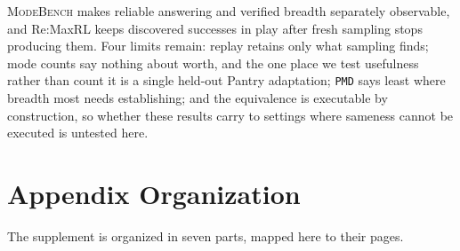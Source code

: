 \documentclass{article}
\newcommand{\1}{\mathbf 1}
\newcommand{\mb}{\textsc{ModeBench}}
\newcommand{\pmd}{\texttt{PMD}}
\theoremstyle{remark}
\theoremstyle{definition}
\theoremstyle{plain}
\begin{document}
\mb{} makes reliable answering and verified breadth separately observable, and
Re:MaxRL keeps discovered successes in play after fresh sampling stops
producing them. Four limits remain: replay retains only what sampling finds;
mode counts say nothing about worth, and the one place we test usefulness
rather than count it is a single held-out Pantry adaptation; \pmd{} says least
where breadth most needs establishing; and the equivalence is executable by
construction, so whether these results carry to settings where sameness cannot
be executed is untested here.

\label{sec:main-end}

\clearpage
{}\label{sec:references}



\long{}

\appendix
\onecolumn
\raggedbottom

\section*{Appendix Organization}
\label{app:organization}
The supplement is organized in seven parts, mapped here to their pages.
\end{document}
